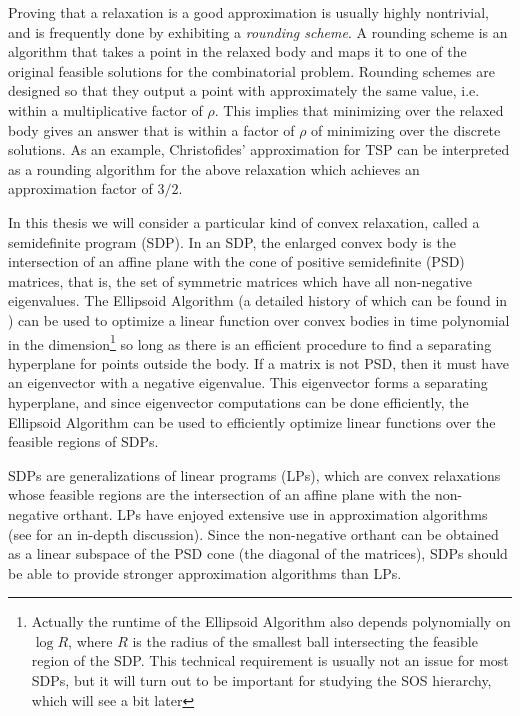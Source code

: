 Proving that a relaxation is a good approximation is usually highly nontrivial, and is frequently done by exhibiting a \emph{rounding scheme}. A rounding scheme is an  algorithm that takes a point in the relaxed body and maps it to one of the original feasible solutions for the combinatorial problem. Rounding schemes are designed so that they output a point with approximately the same value, i.e. within a multiplicative factor of $\rho$. This implies that minimizing over the relaxed body gives an answer that is within a factor of $\rho$ of minimizing over the discrete solutions. As an example, Christofides' approximation for \textsc{TSP} \cite{Chri76} can be interpreted as a rounding algorithm for the above relaxation which achieves an approximation factor of $3/2$.

In this thesis we will consider a particular kind of convex relaxation, called a semidefinite program (SDP). In an SDP, the enlarged convex body is the intersection of an affine plane with the cone of positive semidefinite (PSD) matrices, that is, the set of symmetric matrices which have all non-negative eigenvalues. The Ellipsoid Algorithm (a detailed history of which can be found in \cite{Akg84}) can be used to optimize a linear function over convex bodies in time polynomial in the dimension\footnote{Actually the runtime of the Ellipsoid Algorithm also depends polynomially on $\log R$, where $R$ is the radius of the smallest ball intersecting the feasible region of the SDP. This technical requirement is usually not an issue for most SDPs, but it will turn out to be important for studying the SOS hierarchy, which will see a bit later} so long as there is an efficient procedure to find a separating hyperplane for points outside the body. If a matrix is not PSD, then it must have an eigenvector with a negative eigenvalue. This eigenvector forms a separating hyperplane, and since eigenvector computations can be done efficiently, the Ellipsoid Algorithm can be used to efficiently optimize linear functions over the feasible regions of SDPs. 

SDPs are generalizations of linear programs (LPs), which are convex relaxations whose feasible regions are the intersection of an affine plane with the non-negative orthant. LPs have enjoyed extensive use in approximation algorithms (see \cite{WSbook11} for an in-depth discussion). Since the non-negative orthant can be obtained as a linear subspace of the PSD cone (the diagonal of the matrices), SDPs should be able to provide stronger approximation algorithms than LPs. 


